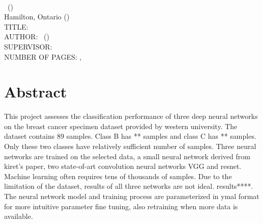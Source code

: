 \documentclass[
12pt, %
oneside, %
english, %
onehalfpacing, %
]{McMasterThesis} %
\begin{document}
\noindent %
\univname \\ 
\degreename\, (\the\year) \\
Hamilton, Ontario (\deptname) \\[1.5cm]
TITLE: \ttitle \\
AUTHOR: \authorname\,  %
(\univname)  \\
SUPERVISOR: \supname\, \\ 
NUMBER OF PAGES: \pageref{lastoffront}, \pageref{LastPage}  %

\clearpage


\section*{\Huge Abstract} 
This project assesses the classification performance of three deep neural networks on the breast cancer specimen dataset provided by western university. The dataset contains 89 samples. Class B has ** samples and class C has ** samples. Only these two classes have relatively sufficient number of samples. Three neural networks are trained on the selected data, a small neural network derived from kiret’s paper, two state-of-art convolution neural networks VGG and resnet. Machine learning often requires tens of thousands of samples. Due to the limitation of the dataset, results of all three networks are not ideal. results****. The neural network model and training process are parameterized in ymal format for more intuitive parameter fine tuning, also retraining when more data is available.\clearpage
\end{document}
